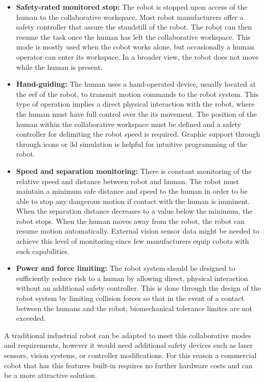 \begin{itemize}
    \item \textbf{Safety-rated monitored stop: }The robot is stopped upon access of the human to the collaborative workspace. Most robot manufacturers offer a safety controller that assure the standstill of the robot. The robot can then resume the task once the human has left the collaborative workspace. This mode is mostly used when the cobot works alone, but occasionally a human operator can enter its workspace. In a broader view, the robot does not move while the human is present.
    \item \textbf{Hand-guiding: }The human uses a hand-operated device, usually located at the \ac{eef} of the robot, to transmit motion commands to the robot system. This type of operation implies a direct physical interaction with the robot, where the human must have full control over the its movement. The position of the human within the collaborative workspace must be defined and a safety controller for delimiting the robot speed is required. Graphic support through through icons or \acs{3d} simulation is helpful for intuitive programming of the robot.
    \item \textbf{Speed and separation monitoring: }There is constant monitoring of the relative speed and distance between robot and human. The robot must maintain a minimum safe distance and speed to the human in order to be able to stop any dangerous motion if contact with the human is imminent. When the separation distance decreases to a value below the minimum, the robot stops. When the human moves away from the robot, the robot can resume motion automatically. External vision sensor data might be needed to achieve this level of monitoring since few manufacturers equip cobots with such capabilities. 
    \item \textbf{Power and force limiting: }The robot system should be designed to sufficiently reduce risk to a human by allowing direct, physical interaction without an additional safety controller. This is done through the design of the robot system by limiting collision forces so that in the event of a contact between the humans and the robot, biomechanical tolerance limites are not exceeded.
\end{itemize}

\par A traditional industrial robot can be adapted to meet this collaborative modes and requirements, however it would need additional safety devices such as laser sensors, vision systems, or controller modifications. For this reason a commercial cobot that has this features built-in requires no further hardware costs and can be a more attractive solution.

